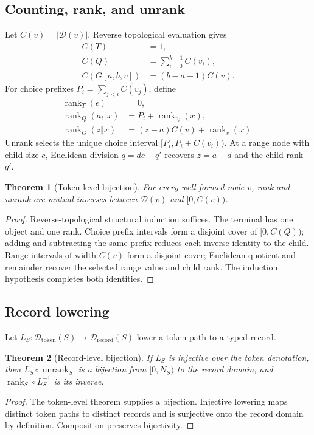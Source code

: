 \documentclass[10pt]{article}
\newtheorem{theorem}{Theorem}
\newcommand{\D}{\mathcal{D}}
\newcommand{\rank}{\operatorname{rank}}
\newcommand{\unrank}{\operatorname{unrank}}
\begin{document}
\subsection{Counting, rank, and unrank}
Let \(C(v)=|\D(v)|\). Reverse topological evaluation gives
\begin{align}
C(T)&=1,\\
C(Q)&=\sum_{i=0}^{k-1}C(v_i),\\
C(G[a,b,v])&=(b-a+1)C(v).
\end{align}
For choice prefixes \(P_i=\sum_{j<i}C(v_j)\), define
\begin{align}
\rank_T(\epsilon)&=0,\\
\rank_Q(a_i\Vert x)&=P_i+\rank_{v_i}(x),\\
\rank_G(z\Vert x)&=(z-a)C(v)+\rank_v(x).
\end{align}
Unrank selects the unique choice interval \([P_i,P_i+C(v_i))\). At a range node with child size \(c\), Euclidean division \(q=dc+q'\) recovers \(z=a+d\) and the child rank \(q'\).

\begin{theorem}[Token-level bijection]
For every well-formed node \(v\), rank and unrank are mutual inverses between \(\D(v)\) and \([0,C(v))\).
\end{theorem}
\begin{proof}
Reverse-topological structural induction suffices. The terminal has one object and one rank. Choice prefix intervals form a disjoint cover of \([0,C(Q))\); adding and subtracting the same prefix reduces each inverse identity to the child. Range intervals of width \(C(v)\) form a disjoint cover; Euclidean quotient and remainder recover the selected range value and child rank. The induction hypothesis completes both identities.
\end{proof}

\subsection{Record lowering}
Let \(L_S:\D_{\mathrm{token}}(S)\rightarrow\D_{\mathrm{record}}(S)\) lower a token path to a typed record.

\begin{theorem}[Record-level bijection]
If \(L_S\) is injective over the token denotation, then
\(L_S\circ\unrank_S\) is a bijection from \([0,N_S)\) to the record domain, and
\(\rank_S\circ L_S^{-1}\) is its inverse.
\end{theorem}
\begin{proof}
The token-level theorem supplies a bijection. Injective lowering maps distinct token paths to distinct records and is surjective onto the record domain by definition. Composition preserves bijectivity.
\end{proof}
\end{document}
